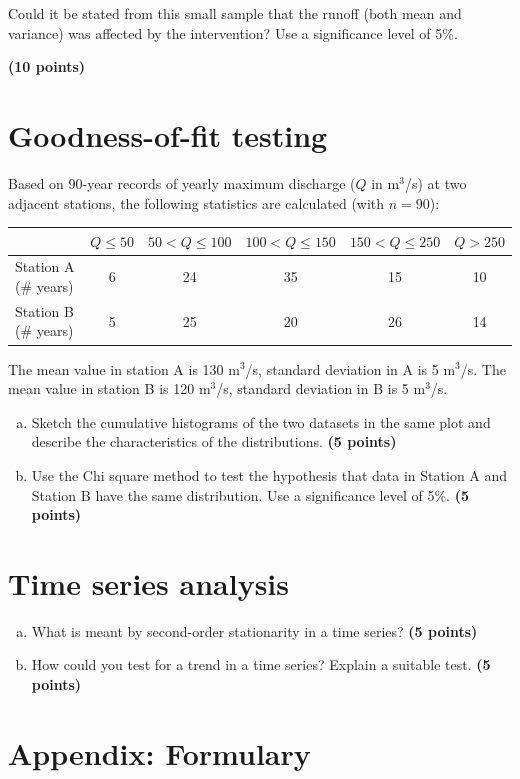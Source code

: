 \documentclass[12pt]{article}
\begin{document}
Could it be stated from this small sample that the runoff (both mean and variance) was affected by the intervention? Use a significance level of 5\%.

\textbf{\hfill (10 points)}


\section{Goodness-of-fit testing}
Based on 90-year records of yearly maximum discharge ($Q$ in m$^3$/s) at two adjacent stations, the following statistics are calculated (with $n=90$):

\begin{table}[h!]
\begin{tabular}{l|c|c|c|c|c}
& $Q \le 50$ & $50<Q \le 100$ & $100<Q \le 150$ & $150<Q \le 250$ & $Q>250$ \\
\hline
Station A (\# years) & 6 & 24 & 35 & 15 & 10 \\
Station B (\# years) & 5 & 25 & 20 & 26 & 14 \\
\hline
\end{tabular}
\end{table}

The mean value in station A is 130 m$^3$/s, standard deviation in A is 5 m$^3$/s.
The mean value in station B is 120 m$^3$/s, standard deviation in B is 5 m$^3$/s.

\begin{enumerate}[(a)] 
\item Sketch the cumulative histograms of the two datasets in the same plot and describe the characteristics of the distributions. \textbf{\hfill (5 points)}
\item Use the Chi square method to test the hypothesis that data in Station A and Station B have the same distribution. Use a significance level of 5\%. \textbf{\hfill (5 points)}
\end{enumerate}


\section{Time series analysis}
\begin{enumerate}[(a)]
\item What is meant by second-order stationarity in a time series? \textbf{\hfill (5 points)}
\item How could you test for a trend in a time series? Explain a suitable test. \textbf{\hfill (5 points)}
\end{enumerate}


\section{Appendix: Formulary}


\end{document}
